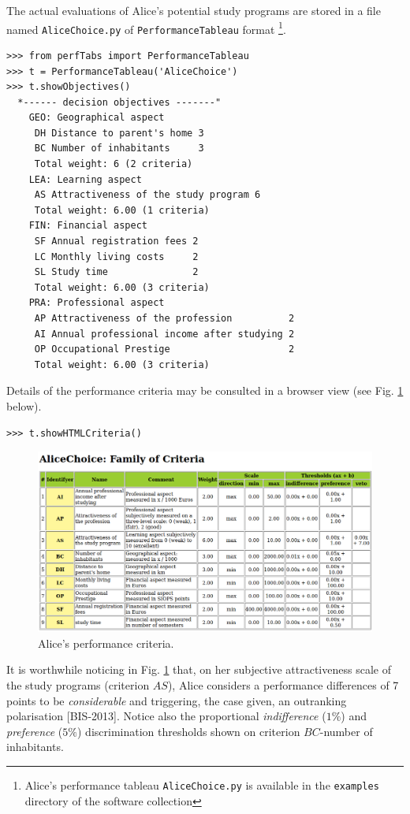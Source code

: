 The actual evaluations of Alice's potential study programs are stored in a file named \texttt{AliceChoice.py} of \texttt{PerformanceTableau} format \footnote{Alice's performance tableau \texttt{AliceChoice.py} is available in the \texttt{examples} directory of the \Digraph software collection}.

\begin{lstlisting}[caption={Alice's performance tableau},label=list:12.1]
>>> from perfTabs import PerformanceTableau
>>> t = PerformanceTableau('AliceChoice')
>>> t.showObjectives()
  *------ decision objectives -------"
    GEO: Geographical aspect
     DH Distance to parent's home 3
     BC Number of inhabitants     3
     Total weight: 6 (2 criteria)
    LEA: Learning aspect
     AS Attractiveness of the study program 6
     Total weight: 6.00 (1 criteria)
    FIN: Financial aspect
     SF Annual registration fees 2
     LC Monthly living costs     2
     SL Study time               2
     Total weight: 6.00 (3 criteria)
    PRA: Professional aspect
     AP Attractiveness of the profession          2
     AI Annual professional income after studying 2
     OP Occupational Prestige                     2
     Total weight: 6.00 (3 criteria)
\end{lstlisting}

Details of the performance criteria may be consulted in a browser view (see Fig. \ref{fig:12.2} below).

\begin{lstlisting}
>>> t.showHTMLCriteria()
\end{lstlisting}
\begin{figure}[h]
\includegraphics[width=12cm]{Figures/aliceCriteria.png}
\caption{Alice's performance criteria.}
\label{fig:12.2}       %
\end{figure}

It is worthwhile noticing in Fig. \ref{fig:12.2} that, on her subjective attractiveness scale of the study programs (criterion $AS$), Alice considers a performance differences of 7 points to be \emph{considerable} and triggering, the case given, an outranking polarisation [BIS-2013]. Notice also the proportional \emph{indifference} ($1\%$) and \emph{preference} ($5\%$) discrimination thresholds shown on criterion $BC$-number of inhabitants.

